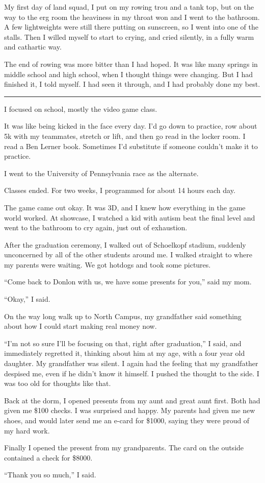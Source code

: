 My first day of land squad, I put on my rowing trou and a tank top, but on the
way to the erg room the heaviness in my throat won and I went to the bathroom.
A few lightweights  were still there putting on sunscreen, so I went into one of
the stalls.  Then I willed myself to start to crying, and cried silently, in a
fully warm and cathartic way.  

The end of rowing was more bitter than I had hoped.  It was like many springs in
middle school and high school, when I thought things were changing.  But I had
finished it, I told myself.  I had seen it through, and I had probably done my
best.


\plainfancybreak{12pt}{2}{* * *}

I focused on school, mostly the video game class.

It was like being kicked in the face every day.  I'd go down to practice, row
about 5k with my teammates, stretch or lift, and then go read in the locker
room.  I read a Ben Lerner book.  Sometimes I'd substitute if someone couldn't
make it to practice.

I went to the University of Pennsylvania race as the alternate. 

Classes ended.  For two weeks, I programmed for about 14 hours each day.  

The game came out okay.  It was 3D, and I knew how everything in the game world
worked.  At showcase, I watched a kid with autism beat the final level and went
to the bathroom to cry again, just out of exhaustion.

After the graduation ceremony, I walked out of Schoelkopf stadium, suddenly
unconcerned by all of the other students around me.  I walked straight to where
my parents were waiting.  We got hotdogs and took some pictures.  

``Come back to Donlon with us, we have some presents for you,'' said my mom. 

``Okay,'' I said.  

On the way long walk up to North Campus, my grandfather said something about how
I could start making real money now.

``I'm not so sure I'll be focusing on that, right after graduation,'' I said,
and immediately regretted it, thinking about him at my age, with a four year old
daughter.  My grandfather was silent.  I again had the feeling that my
grandfather despised me, even if he didn't know it himself.  I pushed the
thought to the side.  I was too old for thoughts like that.

Back at the dorm, I opened presents from my aunt and great aunt first.  Both had
given me \$100 checks.  I was surprised and happy.  My parents had given me new
shoes, and would later send me an e-card for \$1000, saying they were proud of
my hard work.  

Finally I opened the present from my grandparents.  The card on the outside
contained a check for \$8000.  

``Thank you so much,'' I said.
